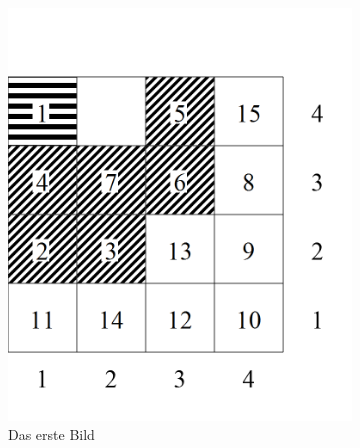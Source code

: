 \begin{figure}[htp] \centering
  \begin{subfigure}[t]{0.38\textwidth}
    \includegraphics[width=\textwidth]{img/pre-solving-bsp-1.png}
    \caption{Das erste Bild}
    \label{fig:example:first:1st}
  \end{subfigure}
  \hfill
  \begin{subfigure}[t]{0.38\textwidth}
    \centering

\end{subfigure}
\end{figure}
